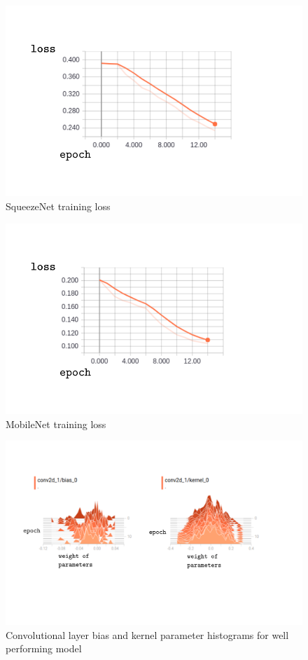 \documentclass{article}
\begin{document}
\begin{figure}[h]
  \includegraphics[width=\linewidth]{squeezeloss.pdf}
  \caption{SqueezeNet training loss}
  \label{fig:squeezeloss}
\end{figure}

\begin{figure}[h]
  \includegraphics[width=\linewidth]{mobileloss.pdf}
  \caption{MobileNet training loss}
  \label{fig:mobileloss}
\end{figure}


\begin{figure}[h]
  \includegraphics[width=\linewidth]{goodearlyweights.pdf}
  \caption{Convolutional layer bias and kernel parameter histograms for well performing model}
  \label{fig:goodearlyweights}
\end{figure}
\end{document}
